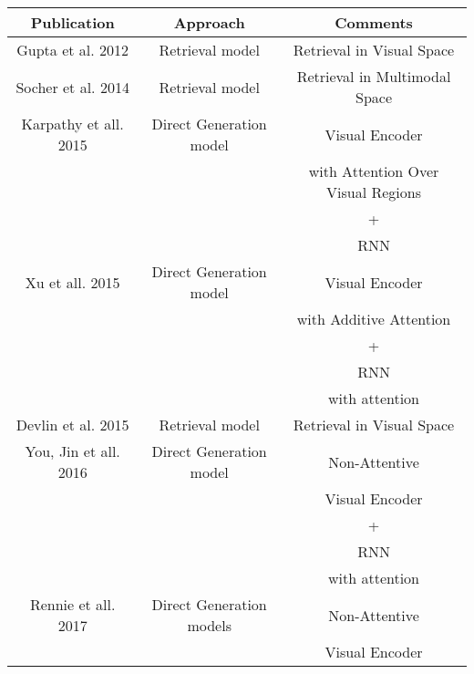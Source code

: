 \begin{table}[H]
\footnotesize
\begin{center}
\begin{tabular}{||c c c||} 
 \hline
 \textbf{Publication} & \textbf{Approach} & \textbf{Comments} \\ [0.5ex] 
 \hline\hline
 Gupta et al. \cite{gupta2012choosing} 2012 & Retrieval model & Retrieval in Visual Space \\ 
 \hline
 Socher et al. \cite{socher2014grounded} 2014 & Retrieval model & Retrieval in Multimodal Space \\ 
 \hline
 Karpathy et all. \cite{karpathy2015deep} 2015 & Direct Generation model &  Visual Encoder   \\ 
 					~      					   &              ~          & with Attention Over Visual Regions \\
 					~						   &              ~          &         + \\
 				    ~						   &              ~          &        RNN \\
 \hline
 Xu et all. \cite{xu2015show} 2015 & Direct Generation model &  Visual Encoder  \\
 					~						   &              ~          &    with Additive Attention \\
                    ~						   &              ~          &        + \\
 				    ~						   &              ~          &        RNN \\
 				    ~						   &              ~          &        with attention \\
 \hline
 Devlin et al. \cite{devlin2015language} 2015 & Retrieval model & Retrieval in Visual Space \\ 
 \hline
 You, Jin et all. \cite{you2016image} 2016     & Direct Generation model &        Non-Attentive \\
 					~						   &              ~          &        Visual Encoder \\
                    ~						   &              ~          &        + \\
 				    ~						   &              ~          &        RNN \\
 				    ~						   &              ~          &        with attention \\
 \hline
 Rennie et all. \cite{rennie2017self} 2017     & Direct Generation models &       Non-Attentive \\
 					~						   &              ~          &        Visual Encoder \\

\end{tabular}
\end{center}
\end{table}
